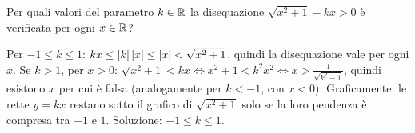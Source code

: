 \documentclass[10pt]{article}
\begin{document}
\bonusexercise Per quali valori del parametro $k \in \spR$ la disequazione $\sqrt{x^2 + 1} - kx > 0$ è verificata per ogni $x \in \spR$?
\bonusexercisescore[1]
\vspace{-.2em}
\bonusexercisenote

\begin{solution}
Per $-1 \leq k \leq 1$: $kx \leq \left\vert k \right\vert\left\vert x \right\vert \leq \left\vert x \right\vert < \sqrt{x^2 + 1}$, quindi la disequazione
vale per ogni $x$. Se $k > 1$, per $x > 0$: $\sqrt{x^2+1} < kx \iff x^2 + 1 < k^2x^2 \iff
x > \frac{1}{\sqrt{k^2 - 1}}$, quindi esistono $x$ per cui è falsa (analogamente per $k < -1$, con
$x < 0$). Graficamente: le rette $y = kx$ restano sotto il grafico di $\sqrt{x^2+1}$ solo se la loro
pendenza è compresa tra $-1$ e $1$. Soluzione: $-1 \leq k \leq 1$.
\end{solution}

\vfill
\finalscore
\end{document}

